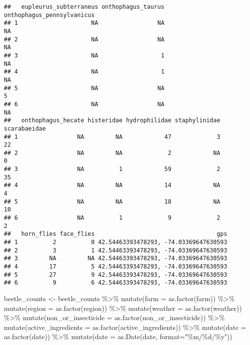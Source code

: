 \documentclass[
]{article}
\newenvironment{Shaded}{\begin{snugshade}}{\end{snugshade}}
\newcommand{\AttributeTok}[1]{\textcolor[rgb]{0.77,0.63,0.00}{#1}}
\newcommand{\FunctionTok}[1]{\textcolor[rgb]{0.00,0.00,0.00}{#1}}
\newcommand{\NormalTok}[1]{#1}
\newcommand{\OtherTok}[1]{\textcolor[rgb]{0.56,0.35,0.01}{#1}}
\newcommand{\SpecialCharTok}[1]{\textcolor[rgb]{0.00,0.00,0.00}{#1}}
\newcommand{\StringTok}[1]{\textcolor[rgb]{0.31,0.60,0.02}{#1}}
\begin{document}
\begin{verbatim}
##   eupleurus_subterraneus onthophagus_taurus onthophagus_pennsylvanicus
## 1                     NA                 NA                         NA
## 2                     NA                 NA                         NA
## 3                     NA                  1                         NA
## 4                     NA                  1                         NA
## 5                     NA                 NA                          5
## 6                     NA                 NA                         NA
##   onthophagus_hecate histeridae hydrophilidae staphylinidae scarabaeidae
## 1                 NA         NA            47             3           22
## 2                 NA         NA             2            NA            0
## 3                 NA          1            59             2           35
## 4                 NA         NA            14            NA            4
## 5                 NA         NA            18            NA           10
## 6                 NA          1             9             2            2
##   horn_flies face_flies                                   gps
## 1          2          0 42.54463393478293, -74.03369647630593
## 2          3          1 42.54463393478293, -74.03369647630593
## 3         NA         NA 42.54463393478293, -74.03369647630593
## 4         17          5 42.54463393478293, -74.03369647630593
## 5         27          9 42.54463393478293, -74.03369647630593
## 6          9          6 42.54463393478293, -74.03369647630593
\end{verbatim}

\begin{Shaded}
\begin{Highlighting}[]
\NormalTok{beetle\_counts }\OtherTok{\textless{}{-}}\NormalTok{ beetle\_counts }\SpecialCharTok{\%\textgreater{}\%}
  \FunctionTok{mutate}\NormalTok{(}\AttributeTok{farm =} \FunctionTok{as.factor}\NormalTok{(farm)) }\SpecialCharTok{\%\textgreater{}\%}
  \FunctionTok{mutate}\NormalTok{(}\AttributeTok{region =} \FunctionTok{as.factor}\NormalTok{(region)) }\SpecialCharTok{\%\textgreater{}\%}
  \FunctionTok{mutate}\NormalTok{(}\AttributeTok{weather =} \FunctionTok{as.factor}\NormalTok{(weather)) }\SpecialCharTok{\%\textgreater{}\%}
  \FunctionTok{mutate}\NormalTok{(}\AttributeTok{non\_or\_insecticide =} \FunctionTok{as.factor}\NormalTok{(non\_or\_insecticide)) }\SpecialCharTok{\%\textgreater{}\%}
  \FunctionTok{mutate}\NormalTok{(}\AttributeTok{active\_ingredients =} \FunctionTok{as.factor}\NormalTok{(active\_ingredients)) }\SpecialCharTok{\%\textgreater{}\%}
  \FunctionTok{mutate}\NormalTok{(}\AttributeTok{date =} \FunctionTok{as.factor}\NormalTok{(date)) }\SpecialCharTok{\%\textgreater{}\%}
  \FunctionTok{mutate}\NormalTok{(}\AttributeTok{date =} \FunctionTok{as.Date}\NormalTok{(date, }\AttributeTok{format=}\StringTok{"\%m/\%d/\%y"}\NormalTok{))}
\end{Highlighting}
\end{Shaded}
\end{document}
